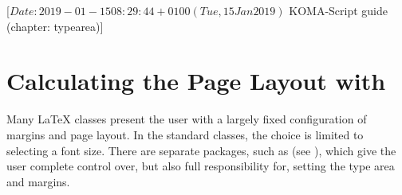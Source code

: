 %
%
%
%
%
%
%
%
% 
%
%
%
%

%
                 [$Date: 2019-01-15 08:29:44 +0100 (Tue, 15 Jan 2019) $
                  KOMA-Script guide (chapter: typearea)]


\chapter{Calculating the Page Layout with }

\BeginIndexGroup%
%
Many {\LaTeX} classes present the
user with a largely fixed configuration of margins and page layout. In the
standard classes, the choice is limited to selecting a font size.
There are separate packages, such as 
(see \cite{package:geometry}), which give the user complete control over, but
also full responsibility for, setting the type area and margins.

